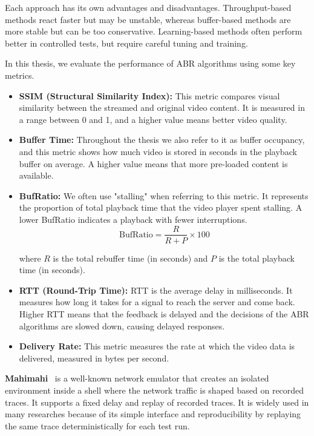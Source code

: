 Each approach has its own advantages and disadvantages. Throughput-based methods react faster but may be unstable, whereas buffer-based methods are more stable but can be too conservative. Learning-based methods often perform better in controlled tests, but require careful tuning and training.

In this thesis, we evaluate the performance of ABR algorithms using some key metrics.

\begin{itemize}
    \item \textbf{SSIM (Structural Similarity Index):} This metric compares visual similarity between the streamed and original video content. It is measured in a range between 0 and 1, and a higher value means better video quality.

    \item \textbf{Buffer Time:} Throughout the thesis we also refer to it as buffer occupancy, and this metric shows how much video is stored in seconds in the playback buffer on average. A higher value means that more pre-loaded content is available.

    \item \textbf{BufRatio:} We often use "stalling" when referring to this metric. It represents the proportion of total playback time that the video player spent stalling. A lower BufRatio indicates a playback with fewer interruptions.
    \[
    \text{BufRatio} = \frac{R}{R + P} \times 100
    \]
    
    \noindent
    where \(R\) is the total rebuffer time (in seconds) and \(P\) is the total playback time (in seconds).

    \item \textbf{RTT (Round-Trip Time):} RTT is the average delay in milliseconds. It measures how long it takes for a signal to reach the server and come back. Higher RTT means that the feedback is delayed and the decisions of the ABR algorithms are slowed down, causing delayed responses.

    \item \textbf{Delivery Rate:} This metric measures the rate at which the video data is delivered, measured in bytes per second.
\end{itemize}

\textbf{Mahimahi}~\cite{mahimahi} is a well-known network emulator that creates an isolated environment inside a shell where the network traffic is shaped based on recorded traces. It supports a fixed delay and replay of recorded traces. It is widely used in many researches because of its simple interface and reproducibility by replaying the same trace deterministically for each test run.

